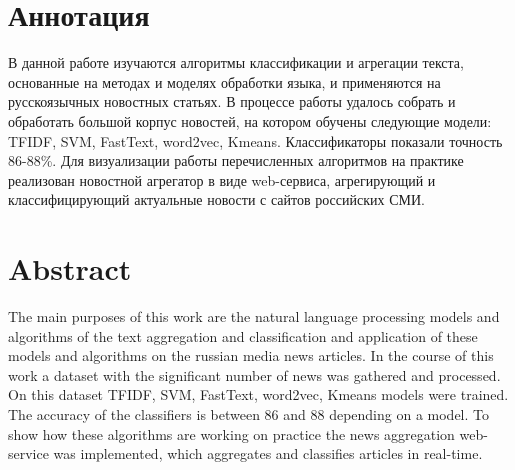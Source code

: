 \titleformat{\section}[block]
{\centering\fontsize{16pt}{18pt}\selectfont\bfseries}{\thesection\cftsecaftersnum}{0.5em}{} %
\section*{Аннотация}
В данной работе изучаются алгоритмы классификации и агрегации текста, основанные на методах и моделях обработки языка, и применяются на русскоязычных новостных статьях. В процессе работы удалось собрать и обработать большой корпус новостей, на котором обучены следующие модели: TFIDF, SVM, FastText, word2vec, Kmeans. Классификаторы показали точность 86-88\%. Для визуализации работы перечисленных алгоритмов на практике реализован новостной агрегатор в виде web-сервиса, агрегирующий и классифицирующий актуальные новости с сайтов российских СМИ. 

\section*{Abstract}
The main purposes of this work are the natural language processing models and algorithms of the text aggregation and classification and application of these models and algorithms on the russian media news articles. In the course of this work a dataset with the significant number of news was gathered and processed. On this dataset TFIDF, SVM, FastText, word2vec, Kmeans models were trained. The accuracy of the classifiers is between 86 and 88 depending on a model. To show how these algorithms are working on practice the news aggregation web-service was implemented, which aggregates and classifies articles in real-time. 

\titleformat{\section}[block]
{\raggedright\fontsize{16pt}{18pt}\selectfont\bfseries}{\thesection\cftsecaftersnum}{0.5em}{} %